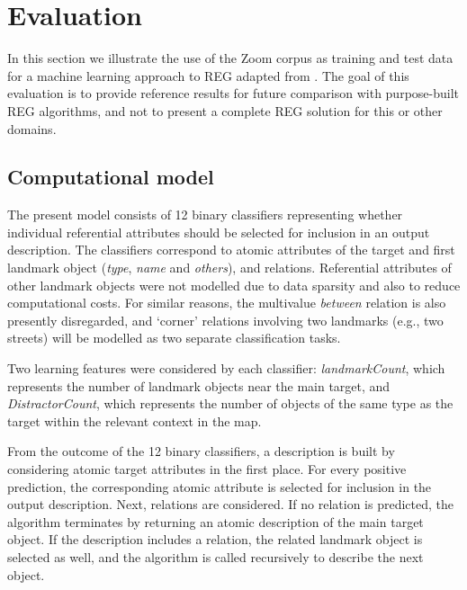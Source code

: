 \section{Evaluation}
\label{sec-eval}

In this section we illustrate the use of the Zoom corpus as training and test data for a machine learning approach to REG adapted from \cite{thiago-svm}. The  goal of this evaluation is to provide reference results for future comparison with purpose-built REG algorithms, and not to present a complete REG solution for this or other domains.

\subsection{Computational model}

The present model consists of 12 binary classifiers representing whether individual referential attributes should be selected for inclusion in an output description. The classifiers correspond to atomic attributes of the target and first landmark object ({\em type}, {\em name} and {\em others}), and relations. Referential attributes of other landmark objects were not modelled due to data sparsity and also to reduce computational costs. For similar reasons, the multivalue {\em between} relation is also presently disregarded, and `corner' relations involving two landmarks (e.g., two streets) will be modelled as two separate classification tasks.

Two learning features were considered by each classifier: {\em landmarkCount}, which represents the number of landmark objects near the main target, and {\em DistractorCount}, which represents the number of objects of the same type as the target within the relevant context in the map.

From the outcome of the 12 binary classifiers, a description is built by considering atomic target attributes in the first place. For every positive prediction, the corresponding atomic attribute is selected for inclusion in the output description. Next, relations are considered. If no relation is predicted, the algorithm terminates by returning an atomic description  of the main target object. If the description includes a relation, the related landmark object is selected  as well, and the algorithm is called recursively to describe the next object.

